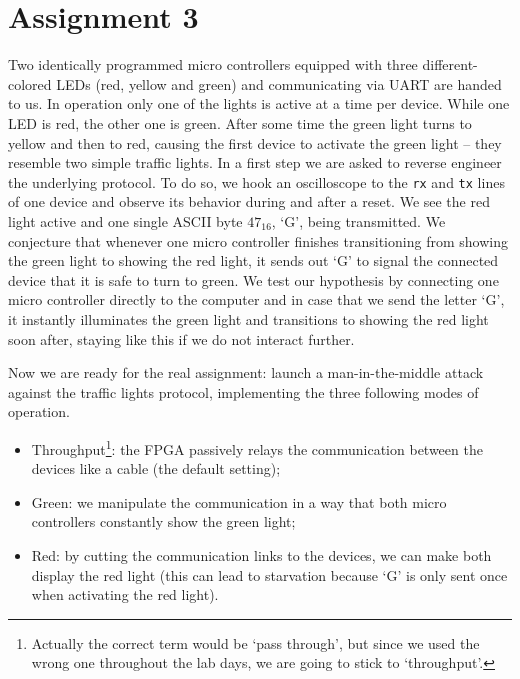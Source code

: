 \section*{Assignment 3}


Two identically programmed micro controllers equipped with three different-colored LEDs (red, yellow and green) and communicating via UART are handed to us. In operation only one of the lights is active at a time per device. While one LED is red, the other one is green. After some time the green light turns to yellow and then to red, causing the first device to activate the green light -- they resemble two simple traffic lights. In a first step we are asked to reverse engineer the underlying protocol. To do so, we hook an oscilloscope to the \texttt{rx} and \texttt{tx} lines of one device and observe its behavior during and after a reset. We see the red light active and one single ASCII byte $47_{16}$, `G', being transmitted. We conjecture that  whenever one micro controller finishes transitioning from showing the green light to showing the red light, it sends out `G' to signal the connected device that it is safe to turn to green. We test our hypothesis by connecting one micro controller directly to the computer and in case that we send the letter `G', it instantly illuminates the green light and transitions to showing the red light soon after, staying like this if we do not interact further.

Now we are ready for the real assignment: launch a man-in-the-middle attack against the traffic lights protocol, implementing the three following modes of operation.

\begin{itemize}
    \item[] \textsf{Throughput}\footnote{Actually the correct term would be `pass through', but since we used the wrong one throughout the lab days, we are going to stick to `throughput'.}: the FPGA passively relays the communication between the devices like a cable (the default setting);
    \item[] \textsf{Green}: we manipulate the communication in a way that both micro controllers constantly show the green light;
    \item[] \textsf{Red}: by cutting the communication links to the devices, we can make both display the red light (this can lead to starvation because `G' is only sent once when activating the red light).
\end{itemize}

